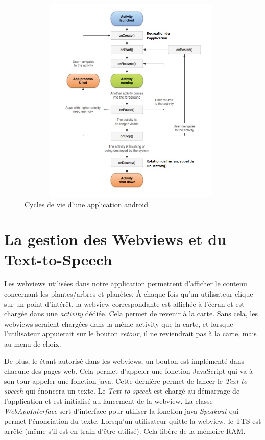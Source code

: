 \documentclass[a4paper,11pt]{article}
\begin{document}
		 \begin{figure}[H]
     \begin{center}
      \includegraphics[width=11cm,height=10cm]{cyclerotation.jpg}
      \caption{Cycles de vie d'une application android}
     \end{center}
    \end{figure}
		
		\section{La gestion des Webviews et du Text-to-Speech}
		Les webviews utilisées dans notre application permettent d'afficher le contenu concernant les plantes/arbres et planètes. À chaque fois qu'un utilisateur clique sur un point d'intérêt, la webview correspondante est affichée à l'écran et est chargée dans une \emph{activity} dédiée. Cela permet de revenir à la carte. Sans cela, les webviews seraient chargées dans la même activity que la carte, et lorsque l'utilisateur appuierait sur le bouton \emph{retour}, il ne reviendrait pas à la carte, mais au menu de choix.
		
		De plus, le étant autorisé dans les webviews, un bouton est implémenté dans chacune des pages web. Cela permet d'appeler une fonction JavaScript qui va à son tour appeler une fonction java. Cette dernière permet de lancer le \emph{Text to speech} qui énoncera un texte.
		Le \emph{Text to speech} est chargé au démarrage de l’application et est initialisé au lancement de la webview. La classe \emph{WebAppInterface} sert d'interface pour utiliser la fonction java \emph{Speakout} qui permet l'énonciation du texte. Lorsqu'un utilisateur quitte la webview, le TTS est arrêté (même s'il est en train d'être utilisé). Cela libère de la mémoire RAM.
		
\end{document}
